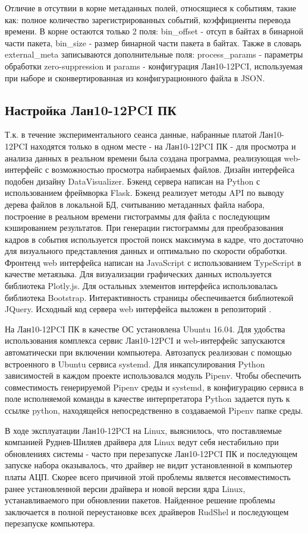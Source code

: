 \documentclass[a4paper,14pt]{extreport}
\begin{document}
Отличие в отсутвии в корне метаданных полей, относящиеся к событиям, такие как: полное количество зарегистрированных событий, коэффициенты перевода времени. В корне остаются только 2 поля: bin\_offset - отсуп в байтах в бинарной части пакета, bin\_size - размер бинарной части пакета в байтах. Также в словарь external\_meta записываются дополнительные поля: process\_params - параметры обработки zero-suppression и params - конфигурация Лан10-12PCI, используемая при наборе и сконвертированная из конфигурационного файла в JSON.

\subsection{Настройка Лан10-12PCI ПК}
Т.к. в течение экспериментального сеанса данные, набранные платой Лан10-12PCI находятся только в одном месте - на Лан10-12PCI ПК - для просмотра и анализа данных в реальном времени была создана программа, реализующая web-интерфейс с возможностью просмотра набираемых файлов. Дизайн интерфейса подобен дизайну DataVisualizer. Бэкенд сервера написан на Python с использованием фреймворка Flask. Бэкенд реализует методы API по выводу дерева файлов в локальной БД, считыванию метаданных файла набора, построение в реальном времени гистограммы для файла с последующим кэшированием результатов. При генерации гистограммы для преобразования кадров в события используется простой поиск максимума в кадре, что достаточно для визуального представления данных и оптимально по скорости обработки. Фронтенд web интерфейса написан на JavaScript с использованием TypeScript в качестве метаязыка. Для визуализации графических данных используется библиотека Plotly.js. Для остальных элементов интерфейса использовалась библиотека Bootstrap. Интерактивность страницы обеспечивается библиотекой JQuery. Исходный код сервера web интерфейса выложен в репозиторий \cite{lan10-viewer}.

На Лан10-12PCI ПК в качестве ОС установлена Ubuntu 16.04. Для удобства использования комплекса сервис Лан10-12PCI и web-интерфейс запускаются автоматически при включении компьютера. Автозапуск реализован с помощью встроенного в Ubuntu сервиса systemd. Для инкапсулирования Python зависимостей в каждом проекте использовался модуль Pipenv. Чтобы обеспечить совместимость генерируемой Pipenv среды и systemd, в конфигурацию сервиса в поле исполняемой команды в качестве интерпретатора Python задается путь к ссылке python, находящейся непосредственно в создаваемой Pipenv папке среды.

В ходе эксплуатации Лан10-12PCI на Linux, выяснилось, что поставляемые компанией Руднев-Шиляев драйвера для Linux ведут себя нестабильно при обновлениях системы - часто при перезапуске Лан10-12PCI ПК и последующем запуске набора оказывалось, что драйвер не видит установленной в компьютер платы АЦП. Скорее всего причиной этой проблемы является несовместимость ранее установленной версии драйвера и новой версии ядра Linux, устанавливаемого при обновлении пакетов. Найденное решение проблемы заключается в полной переустановке всех драйверов RudShel и последующем перезапуске компьютера.
\end{document}
